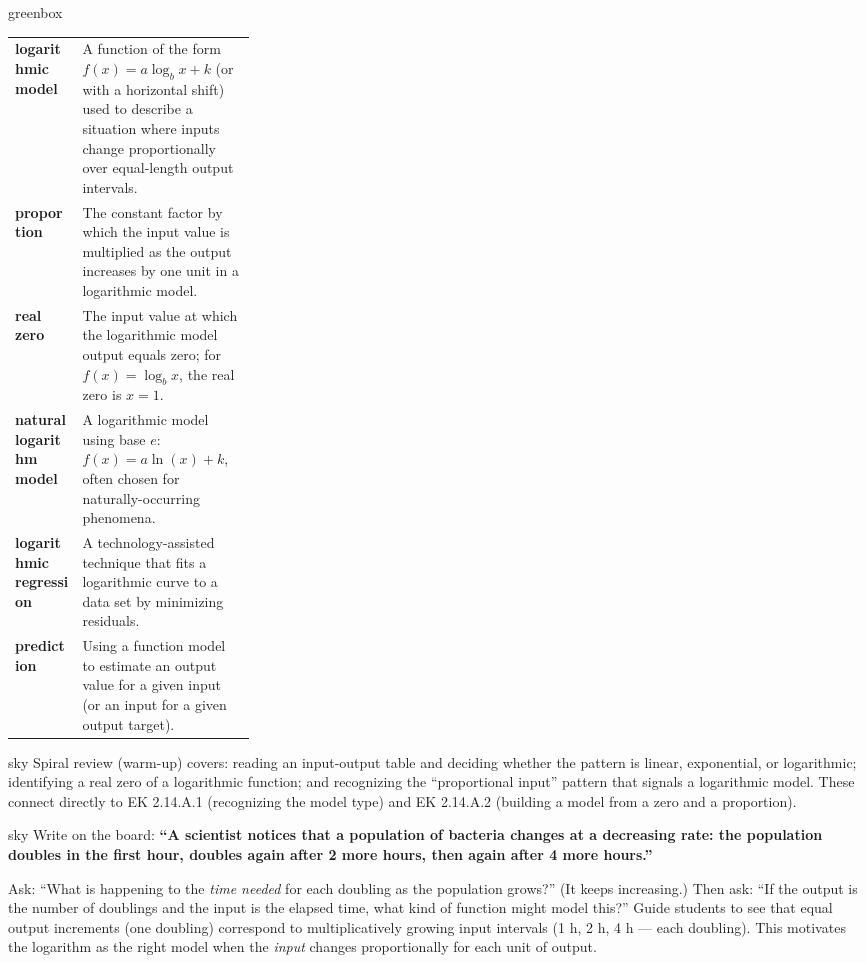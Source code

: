 \documentclass[10pt]{article}
\begin{document}
\begin{skillbox}{greenbox}
\renewcommand{\arraystretch}{1.4}
\begin{tabularx}{\linewidth}{@{} >{\bfseries\color{navy}}p{0.28\linewidth} X @{}}
logarithmic model & A function of the form $f(x) = a\log_b x + k$ (or with a horizontal
                    shift) used to describe a situation where inputs change proportionally over
                    equal-length output intervals. \\
proportion        & The constant factor by which the input value is multiplied as the output
                    increases by one unit in a logarithmic model. \\
real zero         & The input value at which the logarithmic model output equals zero;
                    for $f(x) = \log_b x$, the real zero is $x = 1$. \\
natural logarithm model & A logarithmic model using base $e$: $f(x) = a\ln(x) + k$, often
                    chosen for naturally-occurring phenomena. \\
logarithmic regression & A technology-assisted technique that fits a logarithmic curve to a
                    data set by minimizing residuals. \\
prediction        & Using a function model to estimate an output value for a given input
                    (or an input for a given output target). \\
\end{tabularx}
\end{skillbox}

\begin{skillbox}{sky}
    Spiral review (warm-up) covers: reading an input-output table and deciding whether
    the pattern is linear, exponential, or logarithmic; identifying a real zero of a
    logarithmic function; and recognizing the ``proportional input'' pattern that signals
    a logarithmic model. These connect directly to EK 2.14.A.1 (recognizing the model type)
    and EK 2.14.A.2 (building a model from a zero and a proportion).
\end{skillbox}

\begin{skillbox}[Hook]{sky}
    Write on the board: \textbf{``A scientist notices that a population of bacteria changes at
    a decreasing rate: the population doubles in the first hour, doubles again after 2 more
    hours, then again after 4 more hours.''}

    Ask: ``What is happening to the \emph{time needed} for each doubling as the population
    grows?'' (It keeps increasing.) Then ask: ``If the output is the number of doublings and
    the input is the elapsed time, what kind of function might model this?'' Guide students
    to see that equal output increments (one doubling) correspond to multiplicatively growing
    input intervals (1 h, 2 h, 4 h --- each doubling). This motivates the logarithm as the
    right model when the \emph{input} changes proportionally for each unit of output.
\end{skillbox}
\end{document}
